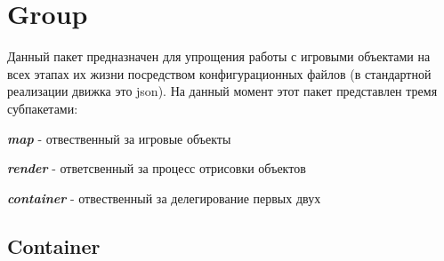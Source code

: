 \documentclass[11pt]{report}
\newenvironment{itemize*}%
  {\begin{itemize}%
    \setlength{\itemsep}{2pt}%
    \setlength{\parskip}{0.75pt}}%
  {\end{itemize}}
\begin{document}
\chapter{Group}
Данный пакет предназначен для упрощения работы с игровыми объектами на всех этапах их жизни посредством конфигурационных файлов (в стандартной реализации движка это json). На данный момент этот пакет представлен тремя субпакетами: \begin{itemize*}

	\item \textit{\textbf{map}} - отвественный за игровые объекты
	\item \textit{\textbf{render}} - ответсвенный за процесс отрисовки объектов
	\item \textit{\textbf{container}} - отвественный за делегирование первых двух
\\
\end{itemize*}

\section{Container}
\end{document}
